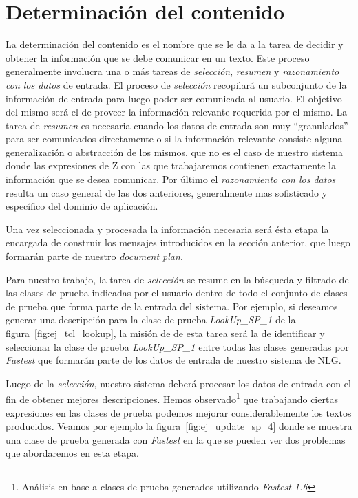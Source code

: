 \section{Determinación del contenido}

La determinación del contenido es el nombre que se le da a la tarea de decidir y obtener la información que se debe comunicar en un texto. Este proceso generalmente involucra una o más tareas de \emph{selección}, \emph{resumen} y \emph{razonamiento con los datos} de entrada.
El proceso de \emph{selección} recopilará un subconjunto de la información de entrada para luego poder ser comunicada al usuario. El objetivo del mismo será el de proveer la información relevante requerida por el mismo.
La tarea de \emph{resumen} es necesaria cuando los datos de entrada son muy ``granulados'' para ser comunicados directamente o si la información relevante consiste alguna generalización o abstracción de los mismos, que no es el caso de nuestro sistema donde las expresiones de Z con las que trabajaremos contienen exactamente la información que se desea comunicar.
Por último el \emph{razonamiento con los datos} resulta un caso general de las dos anteriores, generalmente mas sofisticado y específico del dominio de aplicación. 

Una vez seleccionada y procesada la información necesaria será ésta etapa la encargada de construir los mensajes introducidos en la sección anterior, que luego formarán parte de nuestro \emph{document plan}.

Para nuestro trabajo, la tarea de \emph{selección} se resume en la búsqueda y filtrado de las clases de prueba indicadas por el usuario dentro de todo el conjunto de clases de prueba que forma parte de la entrada del sistema. Por ejemplo, si deseamos generar una descripción para la clase de prueba \emph{LookUp\_SP\_1} de la figura~\ref{fig:ej_tcl_lookup}, la misión de de esta tarea será la de identificar y seleccionar la clase de prueba \emph{LookUp\_SP\_1} entre todas las clases generadas por \emph{Fastest} que formarán parte de los datos de entrada de nuestro sistema de NLG.

Luego de la \emph{selección}, nuestro sistema deberá procesar los datos de entrada con el fin de obtener mejores descripciones. Hemos observado\footnote{Análisis en base a clases de prueba generados utilizando \emph{Fastest 1.6}} que trabajando ciertas expresiones en las clases de prueba podemos mejorar considerablemente los textos producidos. Veamos por ejemplo la figura~\ref{fig:ej_update_sp_4} donde se muestra una clase de prueba generada con \emph{Fastest} en la que se pueden ver dos problemas que abordaremos en esta etapa.

